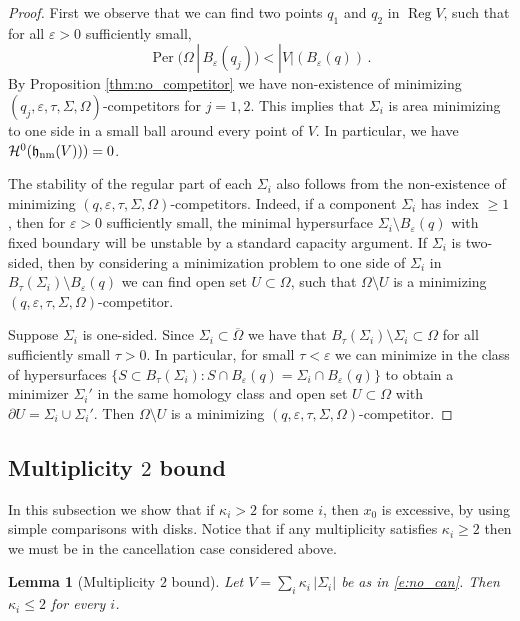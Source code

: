 \documentclass[12pt,twoside]{amsart}
\numberwithin{equation}{section}
\renewcommand{\leq}{\leqslant}
\renewcommand{\geq}{\geqslant}
\newtheorem{lemma}[theorem]{Lemma}
\renewcommand{\cH}{\mathcal H}
\DeclareMathOperator{\Per}{Per}
\newcommand{\eps}{\varepsilon}
\DeclareMathOperator{\reg}{Reg}
\DeclareMathOperator{\hnm}{\mathfrak{h}_\textnormal{nm}}
\begin{document}
\begin{proof} 
First we observe that we can find two points $q_1$ and $q_2$ in $\reg V$,
such that for all $\eps>0$ sufficiently small,
\[
\Per(\Omega\,|\,B_\eps(q_j)) < | V |(B_\eps(q)) \, .
\]
By Proposition \ref{thm:no_competitor} we have non-existence
of minimizing $(q_j,\eps, \tau, \Sigma, \Omega)$-competitors
for $j=1,2$. This implies that 
 $\Sigma_i$ is area minimizing to one side
in a small ball around every point of $V$. In particular,
we have $\cH^{0}(\hnm(V)))=0$.

The stability of the regular part of each $\Sigma_i$ also follows from the
non-existence of minimizing $(q,\eps, \tau, \Sigma, \Omega)$-competitors.
Indeed, if a component $\Sigma_i$ has index $\geq 1$,
then for $\eps>0$ sufficiently small, the  minimal
hypersurface $\Sigma_i \setminus B_{\eps}(q)$ with fixed boundary
will be unstable by a standard capacity argument.
If $\Sigma_i$ is two-sided, then by considering a minimization problem
to one side of $\Sigma_i$ 
in $B_\tau(\Sigma_i) \setminus B_\eps(q)$
we can find open set $U \subset \Omega$,
such that $\Omega \setminus U$ is a minimizing 
$(q,\eps, \tau, \Sigma, \Omega)$-competitor.

Suppose $\Sigma_i$ is one-sided.
Since $\Sigma_i \subset \overline{\Omega}$
we have that $B_\tau(\Sigma_i)\setminus \Sigma_i \subset \Omega$
for all sufficiently small $\tau>0$.
In particular, for small $\tau< \eps$ 
we can minimize in the class of hypersurfaces
 $\{S\subset B_\tau(\Sigma_i) : S \cap B_\eps(q) = \Sigma_i \cap B_\eps(q)\}$
 to obtain a minimizer $\Sigma_i'$ in the same homology class
 and open set $U \subset \Omega$ with $\partial U = \Sigma_i \cup \Sigma_i'$.
 Then $\Omega \setminus U$ is a minimizing 
$(q,\eps, \tau, \Sigma, \Omega)$-competitor.
\end{proof}

\subsection{Multiplicity $2$ bound} In this subsection we show that if $\kappa_i> 2$ for some $i$, then $x_0$ is excessive, by using simple comparisons with disks. Notice that if any multiplicity satisfies $\kappa_i\geq 2$ then we must be in the cancellation case considered above. 

\begin{lemma}[Multiplicity $2$ bound]\label{l:mult_bound}
Let $V=\sum_{i}\kappa_i\,| \Sigma_i|$ be as in \eqref{e:no_can}. Then $\kappa_i\leq 2$ for every $i$.
\end{lemma}
	
\end{document}
